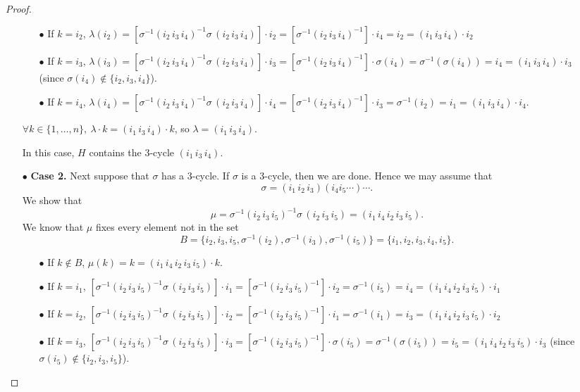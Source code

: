 \documentclass[11pt,a4paper]{article}
\newcommand{\be} {\begin{enumerate}}
\newcommand{\ee} {\end{enumerate}}
\begin{document}
\begin{proof}
\begin{enumerate}
\begin{enumerate}
\item[$\bullet$] If $k=i_2$, $\lambda(i_2) = [\sigma^{-1} (i_2\,i_3\,i_4)^{-1} \sigma\, (i_2\,i_3\,i_4)]\cdot i_2 = [ \sigma^{-1} (i_2\,i_3\,i_4)^{-1}]\cdot i_4 = i_2 = (i_1\,i_3\,i_4)\cdot i_2$

\item[$\bullet$] If $k=i_3$, $\lambda(i_3) = [\sigma^{-1} (i_2\,i_3\,i_4)^{-1} \sigma\, (i_2\,i_3\,i_4)]\cdot i_3 = [ \sigma^{-1} (i_2\,i_3\,i_4)^{-1}]\cdot \sigma(i_4) = \sigma^{-1}(\sigma(i_4)) = i_4 = (i_1\,i_3\,i_4)\cdot i_3\qquad$      (since $\sigma(i_4) \not \in \{i_2,i_3,i_4\}$).

\item[$\bullet$] If $k=i_4$, $\lambda(i_4) = [\sigma^{-1} (i_2\,i_3\,i_4)^{-1} \sigma\, (i_2\,i_3\,i_4)]\cdot i_4 = [ \sigma^{-1} (i_2\,i_3\,i_4)^{-1}]\cdot i_3 = \sigma^{-1}(i_2) = i_1 = (i_1\,i_3\,i_4)\cdot i_4$.

\ee
$\forall k \in \{1,\ldots,n\},\  \lambda\cdot  k = (i_1\,i_3\,i_4)\cdot k$, so $\lambda = (i_1\,i_3\,i_4)$.

In this case, $H$ contains the 3-cycle $(i_1\,i_3\,i_4)$.

\item[$\bullet$] {\bf Case 2. }
Next suppose that $\sigma$ has a 3-cycle. If $\sigma$ is a 3-cycle, then we are done. Hence we may assume that
$$\sigma = (i_1\, i_2\,i_3)(i_4 i_5\cdots)\cdots.$$
We show that
$$\mu = \sigma^{-1} (i_2\, i_3\,i_5)^{-1} \sigma\, (i_2\, i_3\,i_5) = (i_1\, i_4\, i_2 \,i_3\, i_5).$$
We know that $\mu$ fixes every element not in the set 
$$B = \{i_2,i_3,i_5,\sigma^{-1}(i_2),\sigma^{-1}(i_3),\sigma^{-1}(i_5)\} = \{i_1,i_2,i_3,i_4,i_5\}.$$
\be
\item[$\bullet$]  If $k \not \in B$, $\mu(k) = k = (i_1\, i_4\, i_2 \,i_3\, i_5)\cdot k$.

\item[$\bullet$] If $k=i_1$, $[ \sigma^{-1} (i_2\, i_3\,i_5)^{-1} \sigma\, (i_2\, i_3\,i_5)] \cdot i_1 = [ \sigma^{-1} (i_2\, i_3\,i_5)^{-1}]\cdot i_2 = \sigma^{-1}(i_5) = i_4= (i_1\, i_4\, i_2 \,i_3\, i_5)\cdot i_1$

\item[$\bullet$] If $k=i_2$, $[ \sigma^{-1} (i_2\, i_3\,i_5)^{-1} \sigma\, (i_2\, i_3\,i_5)] \cdot i_2 = [ \sigma^{-1} (i_2\, i_3\,i_5)^{-1}]\cdot i_1 = \sigma^{-1}(i_1) = i_3= (i_1\, i_4\, i_2 \,i_3\, i_5)\cdot i_2$

\item[$\bullet$] If $k=i_3$, $[ \sigma^{-1} (i_2\, i_3\,i_5)^{-1} \sigma\, (i_2\, i_3\,i_5)] \cdot i_3 = [ \sigma^{-1} (i_2\, i_3\,i_5)^{-1}]\cdot \sigma(i_5) = \sigma^{-1}(\sigma(i_5)) = i_5= (i_1\, i_4\, i_2 \,i_3\, i_5)\cdot i_3$ (since $\sigma(i_5) \not \in \{i_2,i_3,i_5\}$).


\end{enumerate}
\end{enumerate}
\end{proof}
\end{document}
